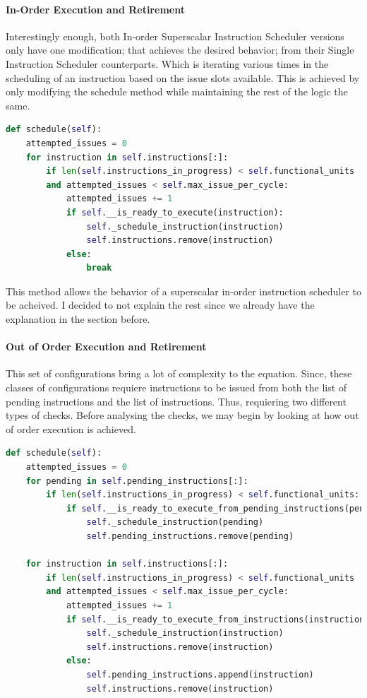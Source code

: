 \documentclass{article}
\begin{document}
\paragraph{In-Order Execution and Retirement}
Interestingly enough, both In-order Superscalar Instruction Scheduler versions only have one modification; that achieves the desired behavior; from their Single Instruction Scheduler counterparts. Which is iterating various times in the scheduling of an instruction based on the issue slots available. This is achieved by only modifying the schedule method while maintaining the rest of the logic the same. 

\begin{lstlisting}[language=Python]
def schedule(self):
    attempted_issues = 0
    for instruction in self.instructions[:]:
        if len(self.instructions_in_progress) < self.functional_units 
        and attempted_issues < self.max_issue_per_cycle:
            attempted_issues += 1
            if self.__is_ready_to_execute(instruction):
                self._schedule_instruction(instruction)
                self.instructions.remove(instruction)
            else:
                break
\end{lstlisting}

This method allows the behavior of a superscalar in-order instruction scheduler to be acheived. I decided to not explain the rest since we already have the explanation in the section before.

\paragraph{Out of Order Execution and Retirement}
This set of configurations bring a lot of complexity to the equation. Since, these classes of configurations requiere instructions to be issued from both the list of pending instructions and the list of instructions. Thus, requiering two different types of checks. Before analysing the checks, we may begin by looking at how out of order execution is achieved.

\begin{lstlisting}[language=Python]
def schedule(self):
    attempted_issues = 0
    for pending in self.pending_instructions[:]:
        if len(self.instructions_in_progress) < self.functional_units:
            if self.__is_ready_to_execute_from_pending_instructions(pending):
                self._schedule_instruction(pending)
                self.pending_instructions.remove(pending)

    for instruction in self.instructions[:]:
        if len(self.instructions_in_progress) < self.functional_units 
        and attempted_issues < self.max_issue_per_cycle:
            attempted_issues += 1
            if self.__is_ready_to_execute_from_instructions(instruction):
                self._schedule_instruction(instruction)
                self.instructions.remove(instruction)
            else:
                self.pending_instructions.append(instruction)
                self.instructions.remove(instruction)
\end{lstlisting}
\end{document}
